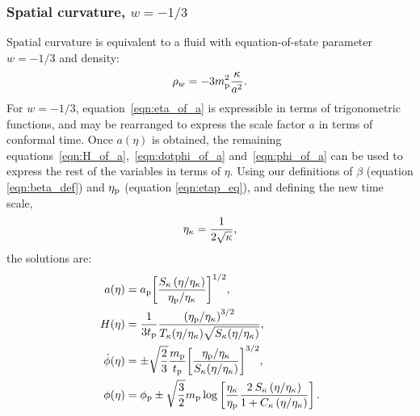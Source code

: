\subsubsection{Spatial curvature, \(w=-1/3\)}
Spatial curvature is equivalent to a fluid with equation-of-state parameter \(w=-1/3\) and density:
%
\begin{equation}
  \rho_w = -3m_{\mathrm{p}}^2\frac{\kappa}{a^{2}}.
\end{equation}
%
For \(w=-1/3\), equation~\eqref{eqn:eta_of_a} is expressible in terms of trigonometric functions, and may be rearranged to express the scale factor \(a\) in terms of conformal time. Once \(a(\eta)\) is obtained, the remaining equations~\eqref{eqn:H_of_a},~\eqref{eqn:dotphi_of_a} and~\eqref{eqn:phi_of_a} can be used to express the rest of the variables in terms of \(\eta\). Using our definitions of \(\beta\) (equation \nolinebreak\ref{eqn:beta_def}) and \(\eta_{\mathrm{p}}\) (equation \nolinebreak\ref{eqn:etap_eq}), and defining the new time scale,
%
\begin{equation}
  \eta_\mathrm{\kappa} = \frac{1}{2\sqrt{\kappa}},
  \label{eqn:etak}
\end{equation}
%
the solutions are:
%
\begin{align}
  a(\eta)
  &=
  a_{\mathrm{p}}{\left[
  \frac
  {S_\kappa\left(\eta/\eta_\mathrm{\kappa}\right)}
  {\eta_{\mathrm{p}}/\eta_\mathrm{\kappa}} \right]}^{1/2},
  \\
  H(\eta)
  &=
  \frac{1}{3t_{\mathrm{p}}}
  \frac{{(\eta_{\mathrm{p}}/\eta_\mathrm{\kappa})}^{3/2}}
  {T_\kappa(\eta/\eta_\mathrm{\kappa})\sqrt{S_\kappa(\eta/\eta_\mathrm{\kappa})}}, 
  \\
  \dot{\phi}(\eta)
  &=
  \pm\sqrt{\frac{2}{3}}
  \frac{m_{\mathrm{p}}}{t_{\mathrm{p}}}
  {\left[
  \frac
  {\eta_{\mathrm{p}}/\eta_\mathrm{\kappa}}
  {S_{\kappa}(\eta/\eta_\mathrm{\kappa})}
  \right]}^{3/2},
  \\
  \phi(\eta) 
  &=
  \phi_{\mathrm{p}} \pm \sqrt{\frac{3}{2}}m_{\mathrm{p}}\log  \left[
  \frac{\eta_\mathrm{\kappa}}{\eta_{\mathrm{p}}} 
  \frac{2\:S_{\kappa}\left(\eta/\eta_\mathrm{\kappa} \right) }
  {1 + C_{\kappa} \left( \eta/\eta_\mathrm{\kappa} \right)   }  
  \right]. 
\end{align}
%



